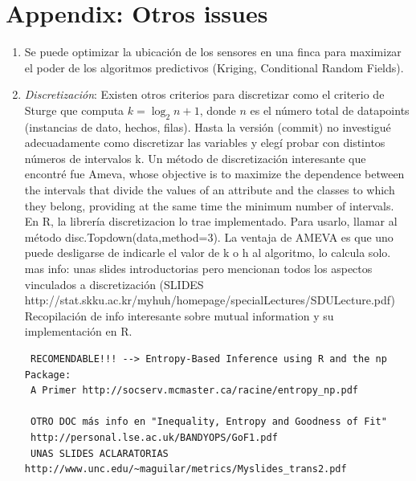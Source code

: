 \documentclass[final,a4paper]{llncs}
\begin{document}




\section*{Appendix: Otros issues}

\begin{enumerate}
\item Se puede optimizar la ubicación de los sensores en una finca 
para maximizar el poder de los algoritmos predictivos
(Kriging, Conditional Random Fields). 
\item \emph{Discretización}: Existen otros criterios para discretizar como el criterio 
de Sturge que computa $k=\log_2n+1 $, donde $n$ es el número total de datapoints 
(instancias de dato, hechos, filas). Hasta la versión (commit) 
no investigué adecuadamente como discretizar las 
variables y elegí probar con distintos números de intervalos k. Un método de 
discretización interesante que encontré fue Ameva, whose objective is to 
maximize the dependence between the intervals that divide the values of an 
attribute and the classes to which they belong, providing at the same time 
the minimum number of intervals. En R, la librería discretizacion lo trae implementado.
Para usarlo, llamar al método disc.Topdown(data,method=3). La ventaja de AMEVA es que 
uno puede desligarse de indicarle el valor de k o h al algoritmo, lo calcula solo.
mas info: unas slides introductorias pero mencionan todos los aspectos vinculados a 
discretización 
(SLIDES http://stat.skku.ac.kr/myhuh/homepage/specialLectures/SDULecture.pdf)
Recopilaci\'{o}n de info interesante sobre mutual information y su implementación
en R.\\

\begin{verbatim}
 RECOMENDABLE!!! --> Entropy-Based Inference using R and the np Package: 
 A Primer http://socserv.mcmaster.ca/racine/entropy_np.pdf

 OTRO DOC más info en "Inequality, Entropy and Goodness of Fit"
 http://personal.lse.ac.uk/BANDYOPS/GoF1.pdf
 UNAS SLIDES ACLARATORIAS http://www.unc.edu/~maguilar/metrics/Myslides_trans2.pdf
\end{verbatim}

\end{enumerate}
\end{document}
